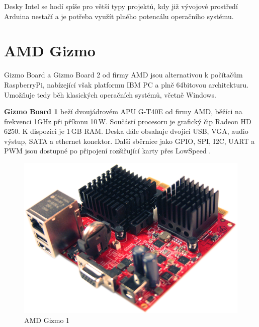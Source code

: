 Desky Intel se hodí spíše pro větší typy projektů, kdy již vývojové prostředí Arduina nestačí a je potřeba využít plného potencálu operačního systému.


 \section{AMD Gizmo}
\label{KapAMD}

	Gizmo Board a Gizmo Board 2 od firmy AMD jsou alternativou k počítačům RaspberryPi, nabízející však platformu IBM PC a plně 64bitovou architekturu. Umožňuje tedy běh klasických operačních systémů, včetně Windows.
	
	
	\textbf{Gizmo Board 1} beží dvoujádrovém APU G-T40E od firmy AMD, běžíci na frekvenci 1GHz při příkonu 10\,W. Součástí procesoru je grafický čip Radeon HD 6250. K dispozici je 1\,GB RAM. Deska dále obsahuje dvojici USB, VGA, audio výstup, SATA a ethernet konektor. Další sběrnice jako GPIO, SPI, I2C, UART a PWM jsou dostupné po připojení rozšiřující karty přes LowSpeed \cite{AmdGizmo1}.
	
				\begin{figure}[!h]
 \begin{center}
    \includegraphics[scale=0.3]{obrazky/embed_amd_gizmo1}
  \end{center}
  \caption{AMD Gizmo 1 \cite{AmdGizmo1}}
\end{figure}

